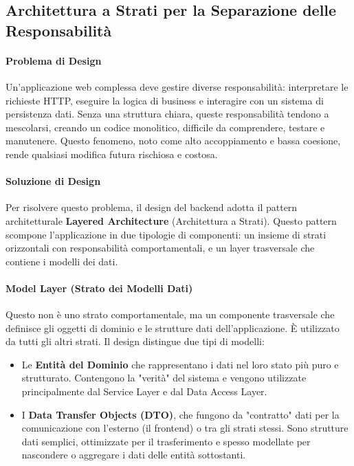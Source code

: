 \documentclass[12pt,a4paper,openright,twoside]{book}
\begin{document}
\subsection{Architettura a Strati per la Separazione delle Responsabilità}
\label{subsec:design_layered}

\paragraph{Problema di Design}
Un'applicazione web complessa deve gestire diverse responsabilità: interpretare le richieste HTTP, eseguire la logica di business e interagire con un sistema di persistenza dati. Senza una struttura chiara, queste responsabilità tendono a mescolarsi, creando un codice monolitico, difficile da comprendere, testare e manutenere. Questo fenomeno, noto come alto accoppiamento e bassa coesione, rende qualsiasi modifica futura rischiosa e costosa.

\paragraph{Soluzione di Design}
Per risolvere questo problema, il design del backend adotta il pattern architetturale \textbf{Layered Architecture} (Architettura a Strati). Questo pattern scompone l'applicazione in due tipologie di componenti: un insieme di strati orizzontali con responsabilità comportamentali, e un layer trasversale che contiene i modelli dei dati.

\paragraph{Model Layer (Strato dei Modelli Dati)}
Questo non è uno strato comportamentale, ma un componente trasversale che definisce gli oggetti di dominio e le strutture dati dell'applicazione. È utilizzato da tutti gli altri strati. Il design distingue due tipi di modelli:
\begin{itemize}
    \item Le \textbf{Entità del Dominio} che rappresentano i dati nel loro stato più puro e strutturato. Contengono la "verità" del sistema e vengono utilizzate principalmente dal Service Layer e dal Data Access Layer.
    \item I \textbf{Data Transfer Objects (DTO)}, che fungono da "contratto" dati per la comunicazione con l'esterno (il frontend) o tra gli strati stessi. Sono strutture dati semplici, ottimizzate per il trasferimento e spesso modellate per nascondere o aggregare i dati delle entità sottostanti.
\end{itemize}
\end{document}
